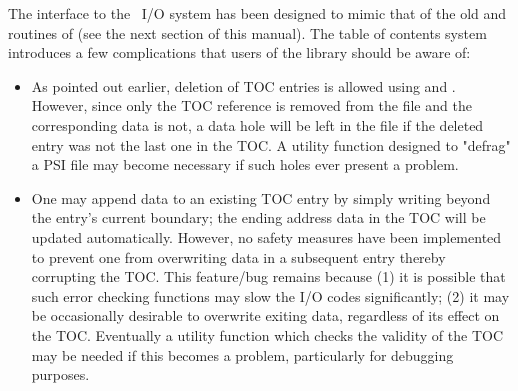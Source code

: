 The interface to the \PSIthree\ I/O system has been designed to mimic
that of the old  and  routines of
 (see the next section of this manual).  The table
of contents system introduces a few complications that users of the
library should be aware of:
\begin{itemize}
\item As pointed out earlier, deletion of TOC entries is allowed using
 and . However, since
only the TOC reference is removed from the file and the corresponding
data is not, a data hole will be left in the file if the deleted entry
was not the last one in the TOC. A utility function designed to
"defrag" a PSI file may become necessary if such holes ever present a
problem.
\item One may append data to an existing TOC entry by simply writing
beyond the entry's current boundary; the ending address data in the
TOC will be updated automatically. However, no safety measures have
been implemented to prevent one from overwriting data in a subsequent
entry thereby corrupting the TOC. This feature/bug remains because (1)
it is possible that such error checking functions may slow the I/O
codes significantly; (2) it may be occasionally desirable to overwrite
exiting data, regardless of its effect on the TOC. Eventually a
utility function which checks the validity of the TOC may be needed if
this becomes a problem, particularly for debugging purposes.
\end{itemize}


